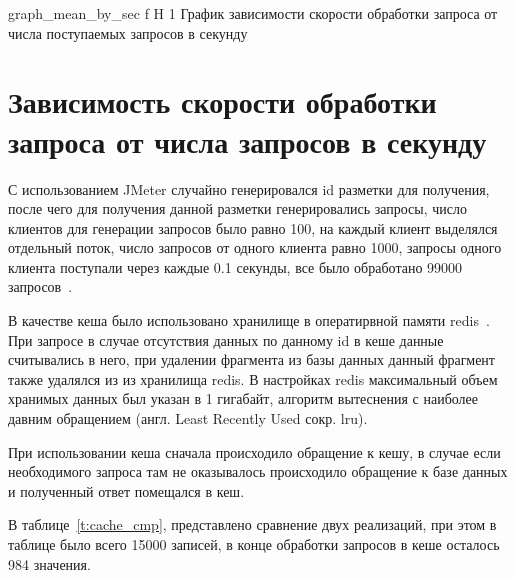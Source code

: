 {graph_mean_by_sec} %
{f} %
{H} %
{1\textwidth} %
{График зависимости скорости обработки запроса от числа поступаемых запросов в секунду} %


\section{Зависимость скорости обработки запроса от числа запросов в секунду}
С использованием JMeter случайно генерировался id разметки для получения, после чего для получения данной разметки генерировались запросы, число клиентов для генерации запросов было равно 100, на каждый клиент выделялся отдельный поток, число запросов от одного клиента равно 1000, запросы одного клиента поступали через каждые 0.1 секунды, все было обработано 99000 запросов~\cite{JMeter}.

В качестве кеша было использовано хранилище в оператирвной памяти redis~\cite{redis}. При запросе в случае отсутствия данных по данному id в кеше данные считывались в него, при удалении фрагмента из базы данных данный фрагмент также удалялся из из хранилища redis. В настройках redis максимальный объем хранимых данных был указан в 1 гигабайт, алгоритм вытеснения с наиболее давним обращением (англ. Least Recently Used сокр. lru).

При использовании кеша сначала происходило обращение к кешу, в случае если необходимого запроса там не оказывалось происходило обращение к базе данных и полученный ответ помещался в кеш.

В таблице~\ref{t:cache_cmp}, представлено сравнение двух реализаций, при этом в таблице было всего 15000 записей, в конце обработки запросов в кеше осталось 984 значения.

